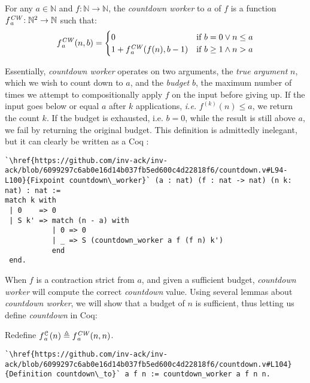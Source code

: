 \begin{defn} \label{defn: countdown-worker}
For any $a\in \mathbb{N}$ and $f: \mathbb{N}\to \mathbb{N}$, the \emph{countdown worker} to $a$ of $f$ is a function $\cdw{f}{a}\ : \mathbb{N}^2\to \mathbb{N}$ such that:
\begin{equation*}
\cdw{f}{a}(n, b) = \begin{cases}
0 & \text{if } b = 0 \vee n\le a \\ 1 +\cdw{f}{a}(f(n), b-1) & \text{if } b \ge 1 \wedge n > a
\end{cases}
\end{equation*}
\end{defn}
Essentially, \emph{countdown worker} operates on two arguments, the \emph{true argument} $n$, which we wish to count down to $a$, and the \emph{budget} $b$, the maximum number of times we attempt 
to compositionally apply $f$ on the input before giving up. If the input goes below or equal $a$ after $k$ applications, \emph{i.e.} $f^{(k)}(n) \le a$, we return the count $k$. If the budget is exhausted, i.e. $b = 0$, while the result is still above $a$, we fail by returning the original budget. This definition is admittedly inelegant, but it can clearly be written as a Coq :
\begin{lstlisting}
`\href{https://github.com/inv-ack/inv-ack/blob/6099297c6ab0e16d14b037fb5ed600c4d22818f6/countdown.v#L94-L100}{Fixpoint countdown\_worker}` (a : nat) (f : nat -> nat) (n k: nat) : nat :=
match k with
 | 0    => 0
 | S k' => match (n - a) with
           | 0 => 0
           | _ => S (countdown_worker a f (f n) k') 
           end
 end.
\end{lstlisting}
When $f$ is a contraction strict from $a$, and given a sufficient budget, \emph{countdown worker} 
will compute the correct \emph{countdown} value.  
Using several lemmas about \emph{countdown worker},
we will show that a budget of $n$ is sufficient, thus letting us define \emph{countdown} in Coq:
\begin{defn} \label{defn: countdown}
Redefine $\cdt{f}{a}(n) \triangleq \cdw{f}{a}(n, n)$.
\begin{lstlisting}
`\href{https://github.com/inv-ack/inv-ack/blob/6099297c6ab0e16d14b037fb5ed600c4d22818f6/countdown.v#L104}{Definition countdown\_to}` a f n := countdown_worker a f n n.
\end{lstlisting}
\end{defn}
